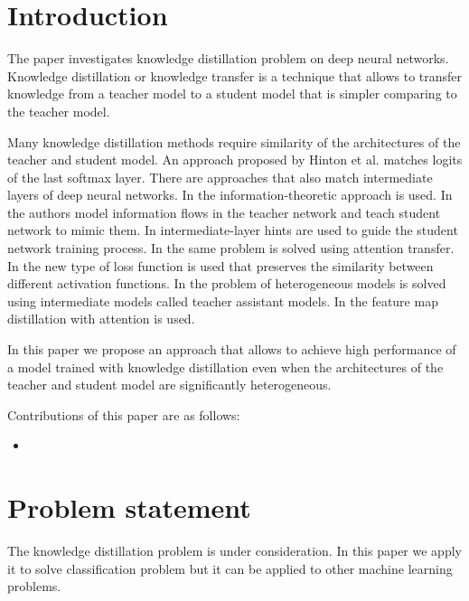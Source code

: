 \documentclass[runningheads]{llncs}
\begin{document}
\section{Introduction}

The paper investigates knowledge distillation problem on deep neural networks. Knowledge distillation or knowledge transfer is a technique that allows to transfer knowledge from a teacher model to a student model that is simpler comparing to the teacher model.

Many knowledge distillation methods require similarity of the architectures of the teacher and student model. An approach proposed by Hinton et al. \cite{journals/corr/HintonVD15} matches logits of the last softmax layer. There are approaches that also match intermediate layers of deep neural networks. In \cite{conf/cvpr/AhnHDLD19} the information-theoretic approach is used. In \cite{conf/cvpr/PassalisTT20} the authors model information flows in the teacher network and teach student network to mimic them. In \cite{journals/corr/RomeroBKCGB14} intermediate-layer hints are used to guide the student network training process. In \cite{journals/corr/ZagoruykoK16a} the same problem is solved using attention transfer. In \cite{conf/iccv/TungM19} the new type of loss function is used that preserves the similarity between different activation functions. In \cite{journals/corr/abs-1902-03393} the problem of heterogeneous models is solved using intermediate models called teacher assistant models. In \cite{journals/corr/abs-2012-03236} the feature map distillation with attention is used.

In this paper we propose an approach that allows to achieve high performance of a model trained with knowledge distillation even when the architectures of the teacher and student model are significantly heterogeneous.

Contributions of this paper are as follows:

\begin{itemize}
    \item 
\end{itemize}

\section{Problem statement}

The knowledge distillation problem is under consideration. In this paper we apply it to solve classification problem but it can be applied to other machine learning problems.
\end{document}
